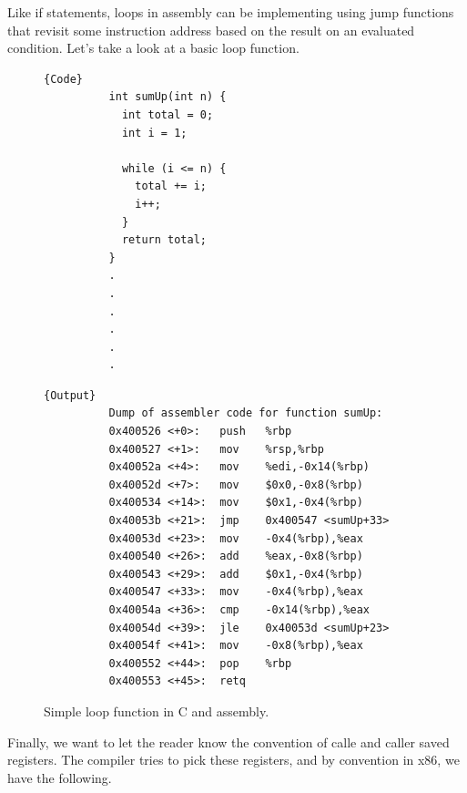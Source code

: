 \documentclass{article}
\begin{document}
      Like if statements, loops in assembly can be implementing using jump functions that revisit some instruction address based on the result on an evaluated condition. Let's take a look at a basic loop function. 

      \begin{figure}[H]
        \centering 
        \noindent\begin{minipage}{.5\textwidth}
        \begin{lstlisting}[]{Code}
          int sumUp(int n) {
            int total = 0;
            int i = 1;

            while (i <= n) {  
              total += i;   
              i++; 
            }
            return total;
          }
          .
          .
          .
          .
          .
          .
        \end{lstlisting}
        \end{minipage}
        \hfill
        \begin{minipage}{.49\textwidth}
        \begin{lstlisting}[]{Output}
          Dump of assembler code for function sumUp:
          0x400526 <+0>:   push   %rbp
          0x400527 <+1>:   mov    %rsp,%rbp
          0x40052a <+4>:   mov    %edi,-0x14(%rbp)
          0x40052d <+7>:   mov    $0x0,-0x8(%rbp)
          0x400534 <+14>:  mov    $0x1,-0x4(%rbp)
          0x40053b <+21>:  jmp    0x400547 <sumUp+33>
          0x40053d <+23>:  mov    -0x4(%rbp),%eax
          0x400540 <+26>:  add    %eax,-0x8(%rbp)
          0x400543 <+29>:  add    $0x1,-0x4(%rbp)
          0x400547 <+33>:  mov    -0x4(%rbp),%eax
          0x40054a <+36>:  cmp    -0x14(%rbp),%eax
          0x40054d <+39>:  jle    0x40053d <sumUp+23>
          0x40054f <+41>:  mov    -0x8(%rbp),%eax
          0x400552 <+44>:  pop    %rbp
          0x400553 <+45>:  retq
        \end{lstlisting}
        \end{minipage}
        \caption{Simple loop function in C and assembly. } 
        \label{fig:loop_function}
      \end{figure}

      Finally, we want to let the reader know the convention of calle and caller saved registers. The compiler tries to pick these registers, and by convention in x86, we have the following. 
\end{document}

